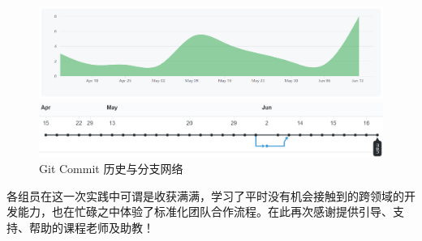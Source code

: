 \documentclass[a4paper]{ctexart}
\numberwithin{equation}{section}
\numberwithin{table}{section}
\numberwithin{figure}{section}
\begin{document}
\begin{figure}[H]
  \begin{minipage}{0.98\linewidth}
    \begin{center}
      \includegraphics[width=0.98\linewidth]{figures/github.png}
    \end{center}
  \end{minipage}
  \vfill
  \begin{minipage}{0.98\linewidth}
    \begin{center}
      \includegraphics[width=0.98\linewidth]{figures/gitnetwork.png}
    \end{center}
  \end{minipage}
  \caption{Git Commit 历史与分支网络}
\end{figure}

各组员在这一次实践中可谓是收获满满，学习了平时没有机会接触到的跨领域的开发能力，也在忙碌之中体验了标准化团队合作流程。在此再次感谢提供引导、支持、帮助的课程老师及助教！


\newpage
\thispagestyle{fancy}
\lhead{}
\chead{\it\small{\textcolor{grey}{参考文献}}}
\rhead{}
{}


\end{document}
